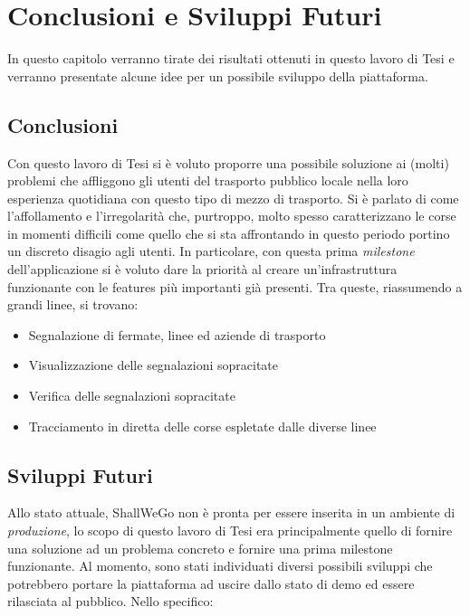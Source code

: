 \chapter{Conclusioni e Sviluppi Futuri} %
%


\begin{citazione}
	In questo capitolo verranno tirate dei risultati ottenuti in questo lavoro di Tesi e verranno presentate alcune idee per un possibile sviluppo della piattaforma.
\end{citazione}

\newpage

\section{Conclusioni}
	Con questo lavoro di Tesi si è voluto proporre una possibile soluzione ai (molti) problemi che affliggono gli utenti del trasporto pubblico locale nella loro esperienza quotidiana con questo tipo di mezzo di trasporto. Si è parlato di come l'affollamento e l'irregolarità che, purtroppo, molto spesso caratterizzano le corse in momenti difficili come quello che si sta affrontando in questo periodo portino un discreto disagio agli utenti. In particolare, con questa prima \textit{milestone} dell'applicazione si è voluto dare la priorità al creare un'infrastruttura funzionante con le features più importanti già presenti. Tra queste, riassumendo a grandi linee, si trovano: 
	\begin{itemize}
		\item Segnalazione di fermate, linee ed aziende di trasporto
		\item Visualizzazione delle segnalazioni sopracitate
		\item Verifica delle segnalazioni sopracitate
		\item Tracciamento in diretta delle corse espletate dalle diverse linee
	\end{itemize}

	\section{Sviluppi Futuri}
		Allo stato attuale, ShallWeGo non è pronta per essere inserita in un ambiente di \textit{produzione}, lo scopo di questo lavoro di Tesi era principalmente quello di fornire una soluzione ad un problema concreto e fornire una prima milestone funzionante. Al momento, sono stati individuati diversi possibili sviluppi che potrebbero portare la piattaforma ad uscire dallo stato di demo ed essere rilasciata al pubblico. Nello specifico: 

